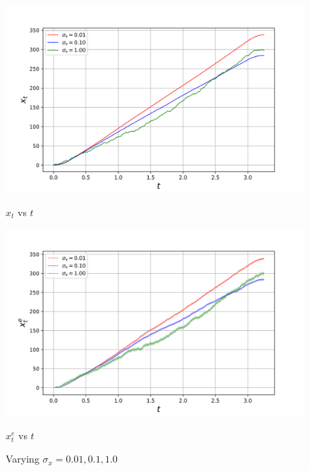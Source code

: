 \begin{figure}[H]
    \centering
    \begin{minipage}{0.491\linewidth}
        \centering
        \includegraphics[width=\linewidth]{plots/part1-d.0-xt.png}
        \caption*{$x_t$ vs $t$}
    \end{minipage}
    \hfill
    \begin{minipage}{0.49\linewidth}
        \centering
        \includegraphics[width=\linewidth]{plots/part1-d.0-xe.png}
         \caption*{$x_t^e$ vs $t$}
    \end{minipage}
    \caption{Varying $\sigma_x = 0.01, 0.1, 1.0$}
    \label{fig:part1-vary-sigma_x}
\end{figure}
